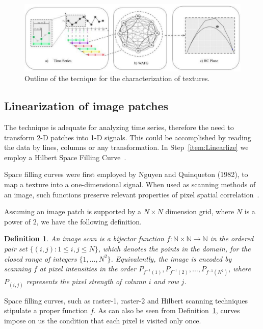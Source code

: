 \documentclass{isprs}
\begin{document}
	\begin{figure}[hbt]
		\centering
		\includegraphics[scale = 0.25]{Figures/WATG.pdf}
		\caption{Outline of the tecnique for the characterization of textures.}
		\label{fig:WATG}
	\end{figure}
	
	\subsection{Linearization of image patches}\label{linearization}
	
	The technique is adequate for analyzing time series, therefore the need to transform 2-D patches into 1-D signals.
	This could be accomplished by reading the data by lines, columns or any transformation.
	In Step~\ref{item:Linearlize} we employ a Hilbert Space Filling Curve~\citep{Lee1994Texture}.
	
	Space filling curves were first employed by Nguyen and Quinqueton (1982), to map a texture into a one-dimensional signal.
	When used as scanning methods of an image, such functions preserve relevant properties of pixel spatial correlation~\citep{Lee1994Texture}.
	
	Assuming an image patch is supported by a $N \times N$ dimension grid, where $N$ is a power of $2$, we have the following definition.
	
	\newtheorem{mydef}{Definition}
	\begin{mydef}
		An image scan is a bijector function $f \colon \mathbb{N} \times \mathbb{N} \to \mathbb{N}$ in the ordered pair set $ \{(i, j): 1 \leq i , j \leq N \}$, which denotes the points in the domain, for the closed range of integers $\{1, \dots, N^2\}$. Equivalently, the image is encoded by scanning $f$ at pixel intensities in the order $P_{f^{-1}(1)}, P_{f^{-1}(2)}, \dots, P_{f^{-1}(N^2)}$, where $P_{(i, j)}$ represents the pixel strength of column $i$ and row $j$.
		\label{def:CurveFilling}
	\end{mydef}
	
	Space filling curves, such as raster-1, raster-2 and Hilbert scanning techniques stipulate a proper function $f$.
	As can also be seen from Definition~\ref{def:CurveFilling}, curves impose on us the condition that each pixel is visited only once.
	
\end{document}
